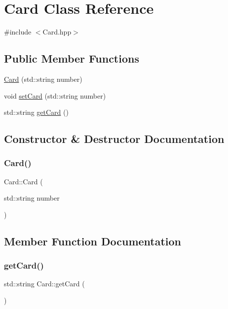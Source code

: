 \hypertarget{class_card}{}\section{Card Class Reference}
\label{class_card}


{\ttfamily \#include $<$Card.\+hpp$>$}

\subsection*{Public Member Functions}
\begin{DoxyCompactItemize}
\item 
\mbox{\hyperlink{class_card_aa9dabf52b287b823d9174ba859b4c858}{Card}} (std\+::string number)
\item 
void \mbox{\hyperlink{class_card_a97571980a043fd28f4a3fc8211d1cae8}{set\+Card}} (std\+::string number)
\item 
std\+::string \mbox{\hyperlink{class_card_ab7919dfd991323fbb9a6750ca03a4787}{get\+Card}} ()
\end{DoxyCompactItemize}


\subsection{Constructor \& Destructor Documentation}
\mbox{\label{class_card_aa9dabf52b287b823d9174ba859b4c858}} 
\subsubsection{\texorpdfstring{Card()}{Card()}}
{\footnotesize\ttfamily Card\+::\+Card (\begin{DoxyParamCaption}\item[{std\+::string}]{number }\end{DoxyParamCaption})}



\subsection{Member Function Documentation}
\mbox{\label{class_card_ab7919dfd991323fbb9a6750ca03a4787}} 
\subsubsection{\texorpdfstring{getCard()}{getCard()}}
{\footnotesize\ttfamily std\+::string Card\+::get\+Card (\begin{DoxyParamCaption}{ }\end{DoxyParamCaption})}

